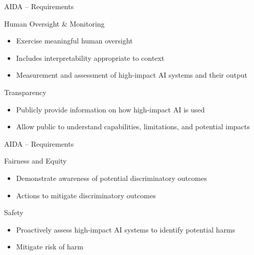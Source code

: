 \documentclass[ignorenonframetext,xcolor=x11names]{beamer}
\begin{document}
\begin{frame}[label=advanced]{AIDA -- Requirements}
\begin{block}{Human Oversight \& Monitoring}
\begin{itemize}
   \item Exercise meaningful human oversight
   \item Includes interpretability appropriate to context
   \item Measurement and assessment of high-impact AI systems and their output
\end{itemize}
\end{block}

\begin{block}{Transparency}
\begin{itemize}
   \item Publicly provide information on how high-impact AI is used
   \item Allow public to understand capabilities, limitations, and potential impacts
\end{itemize}
\end{block}
\end{frame}

\begin{frame}[label=advanced]{AIDA -- Requirements}
\begin{block}{Fairness and Equity}
\begin{itemize}
   \item Demonstrate awareness of potential discriminatory outcomes
   \item Actions to mitigate discriminatory outcomes
\end{itemize}
\end{block}

\begin{block}{Safety}
\begin{itemize}
  \item Proactively assess high-impact AI systems to identify potential harms
  \item Mitigate risk of harm
\end{itemize}
\end{block}
\end{frame}
\end{document}
